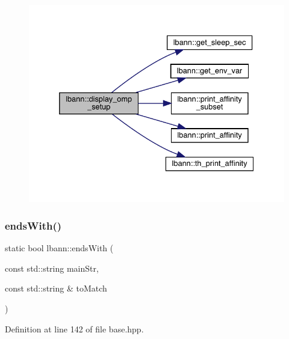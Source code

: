 \begin{figure}[H]
\begin{center}
\leavevmode
\includegraphics[width=332pt]{namespacelbann_a26debfaa06e8490c7f258ed7923870c7_cgraph}
\end{center}
\end{figure}
\mbox{\label{namespacelbann_a02f197bc772ef04f1ac51eb191a02cab}} 
\subsubsection{\texorpdfstring{ends\+With()}{endsWith()}}
{\footnotesize\ttfamily static bool lbann\+::ends\+With (\begin{DoxyParamCaption}\item[{const std\+::string}]{main\+Str,  }\item[{const std\+::string \&}]{to\+Match }\end{DoxyParamCaption})\hspace{0.3cm}{\ttfamily [static]}}



Definition at line 142 of file base.\+hpp.


